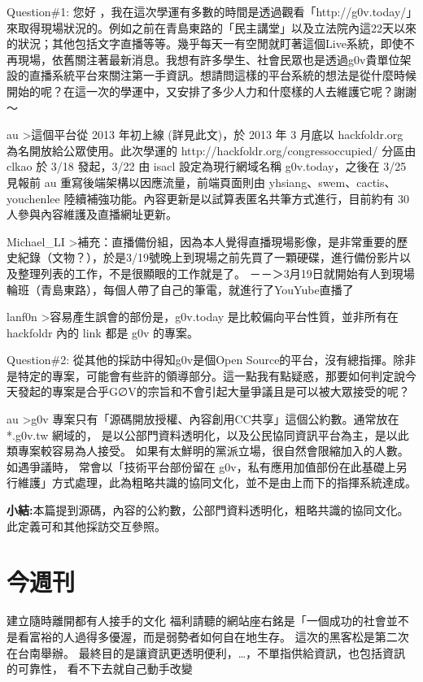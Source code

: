 Question\#1: 您好  ，我在這次學運有多數的時間是透過觀看「http://g0v.today/」來取得現場狀況的。例如之前在青島東路的「民主講堂」以及立法院內這22天以來的狀況；其他包括文字直播等等。幾乎每天一有空閒就盯著這個Live系統，即使不再現場，依舊關注著最新消息。我想有許多學生、社會民眾也是透過g0v貴單位架設的直播系統平台來關注第一手資訊。想請問這樣的平台系統的想法是從什麼時候開始的呢？在這一次的學運中，又安排了多少人力和什麼樣的人去維護它呢？謝謝～

au \textgreater 這個平台從 2013 年初上線 (詳見此文)，於 2013 年 3 月底以 hackfoldr.org 為名開放給公眾使用。此次學運的 http://hackfoldr.org/congressoccupied/ 分區由 clkao 於 3/18 發起，3/22 由 isacl 設定為現行網域名稱 g0v.today，之後在 3/25 見報前 au 重寫後端架構以因應流量，前端頁面則由 yhsiang、swem、cactis、youchenlee 陸續補強功能。內容更新是以試算表匿名共筆方式進行，目前約有 30 人參與內容維護及直播網址更新。

Michael\_LI \textgreater 補充：直播備份組，因為本人覺得直播現場影像，是非常重要的歷史紀錄（文物？），於是3/19號晚上到現場之前先買了一顆硬碟，進行備份影片以及整理列表的工作，不是很顯眼的工作就是了。
－－＞3月19日就開始有人到現場輪班（青島東路），每個人帶了自己的筆電，就進行了YouYube直播了

lanf0n \textgreater 容易產生誤會的部份是，g0v.today 是比較偏向平台性質，並非所有在 hackfoldr 內的 link 都是 g0v 的專案。

Question\#2: 從其他的採訪中得知g0v是個Open Source的平台，沒有總指揮。除非是特定的專案，可能會有些許的領導部分。這一點我有點疑惑，那要如何判定說今天發起的專案是合乎G∅V的宗旨和不會引起大量爭議且是可以被大眾接受的呢？

au \textgreater g0v 專案只有「源碼開放授權、內容創用CC共享」這個公約數。通常放在 *.g0v.tw 網域的，
是以公部門資料透明化，以及公民協同資訊平台為主，是以此類專案較容易為人接受。
如果有太鮮明的黨派立場，很自然會限縮加入的人數。如遇爭議時，
常會以「技術平台部份留在 g0v，私有應用加值部份在此基礎上另行維護」方式處理，此為粗略共識的協同文化，並不是由上而下的指揮系統達成。


\textbf{小結:}本篇提到源碼，內容的公約數，公部門資料透明化，粗略共識的協同文化。此定義可和其他採訪交互參照。

\section{今週刊}

建立隨時離開都有人接手的文化 
福利請聽的網站座右銘是「一個成功的社會並不是看富裕的人過得多優渥，而是弱勢者如何自在地生存。
這次的黑客松是第二次在台南舉辦。
最終目的是讓資訊更透明便利，…，不單指供給資訊，也包括資訊的可靠性，
看不下去就自己動手改變

